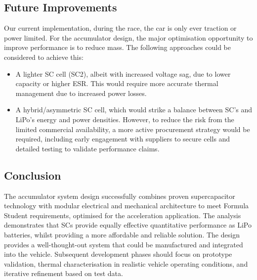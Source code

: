 \documentclass[11pt, a4paper]{report}
\numberwithin{equation}{section}
\begin{document}
\subsection{Future Improvements}

Our current implementation, during the race, the car is only ever traction or power limited. For the accumulator design, the major optimisation opportunity to improve performance is to reduce mass. The following approaches could be considered to achieve this:
\begin{itemize}
    \item A lighter SC cell (SC2), albeit with increased voltage sag, due to lower capacity or higher ESR. This would require more accurate thermal management due to increased power losses.
    \item A hybrid/asymmetric SC cell, which would strike a balance between SC's and LiPo's energy and power densities. However, to reduce the risk from the limited commercial availability, a more active procurement strategy would be required, including early engagement with suppliers to secure cells and detailed testing to validate performance claims.
\end{itemize}

\subsection{Conclusion}
The accumulator system design successfully combines proven supercapacitor technology with modular electrical and mechanical architecture to meet Formula Student requirements, optimised for the acceleration application. The analysis demonstrates that SCs provide equally effective quantitative performance as LiPo batteries, whilst providing a more affordable and reliable solution. The design provides a well-thought-out system that could be manufactured and integrated into the vehicle. Subsequent development phases should focus on prototype validation, thermal characterisation in realistic vehicle operating conditions, and iterative refinement based on test data.

\printbibliography[title={References},prenote=urlcheck]
\end{document}
